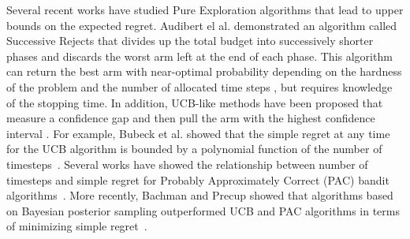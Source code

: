 \documentclass[journal,transmag]{IEEEtran}%
\begin{document}
Several recent works have studied Pure Exploration algorithms that lead to upper bounds on the expected regret.
Audibert el al. demonstrated an algorithm called Successive Rejects that divides up the total budget into successively shorter phases and discards the worst arm left at the end of each phase.
This algorithm can return the best arm with near-optimal probability depending on the hardness of the problem and the number of allocated time steps \cite{audibert2010best}, but requires knowledge of the stopping time.
In addition, UCB-like methods have been proposed that measure a confidence gap and then pull the arm with the highest confidence interval \cite{gabillon2012best}.
For example, Bubeck et al. showed that the simple regret at any time for the UCB algorithm is bounded by a polynomial function of the number of timesteps~\cite{bubeck2009pure}.
Several works have showed the relationship between number of timesteps and simple regret for Probably Approximately Correct (PAC) bandit algorithms~\cite{even2006action, mannor2004sample}.
More recently, Bachman and Precup showed that algorithms based on Bayesian posterior sampling outperformed UCB and PAC algorithms in terms of minimizing simple regret~\cite{bachman2013greedy}.


\end{document}
